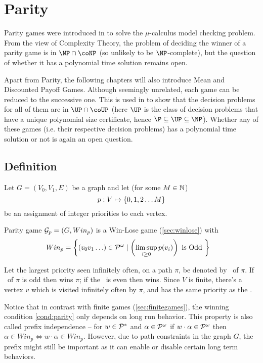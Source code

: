 \chapter{Parity}
\label{chap:par}
Parity games were introduced in \cite{emersonjutla} to solve the $\mu$-calculus model checking problem. From the view of Complexity Theory, the problem of deciding the winner of a parity game is in $\NP \cap \coNP$ (so unlikely to be $\NP$-complete), but the question of whether it has a polynomial time solution remains open.

Apart from Parity, the following chapters will also introduce Mean and Discounted Payoff Games. Although seemingly unrelated, each game can be reduced to the successive one. This is used in \cite{parityup} to show that the decision problems for all of them are in $\UP \cap \coUP$ (here $\UP$ is the class of decision problems that have a unique polynomial size certificate, hence $\P \subseteq \UP \subseteq \NP$). Whether any of these games (i.e. their respective decision problems) has a polynomial time solution or not is again an open question.

\section{Definition}
Let $G=(V_0,V_1,E)$ be a graph and let (for some $M \in \mathbb{N}$)
\[
    p : V \mapsto \left\{0,1,2 \ldots M\right\}
\]
be an assignment of integer priorities to each vertex.

Parity game $\mathcal{G}_p=(G,Win_p)$ is a Win-Lose game (\autoref{sec:winlose}) with
\begin{align}
    Win_p &= \left\{ \left(v_0 v_1 \ldots\right) \in \mathcal{P}^\omega \mid \left(\limsup_{i \geq 0} p(v_i)\right)  \text{ is Odd }\right\} \label{cond:parity}
\end{align}

Let the largest priority seen infinitely often, on a path $\pi$, be denoted by \mip\ of $\pi$. If \mip\ of $\pi$ is odd then  wins $\pi$; if the \mip\ is even then  wins. Since $V$ is finite, there's a vertex $v$ which is visited infinitely often by $\pi$, and has the same priority as the \mip.

Notice that in contrast with finite games (\autoref{sec:finitegames}), the winning condition \eqref{cond:parity} only depends on long run behavior. This property is also called prefix independence -- for $w \in \mathcal{P}^{*}$ and $\alpha \in \mathcal{P}^\omega$ if $w \cdot \alpha \in \mathcal{P}^\omega$ then $\alpha \in Win_p \iff w \cdot \alpha \in Win_p$. However, due to path constraints in the graph $G$, the prefix might still be important as it can enable or disable certain long term behaviors.


